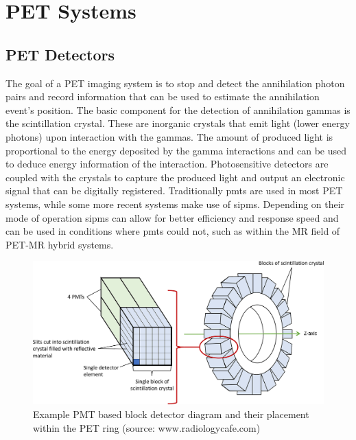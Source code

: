 \section{PET Systems}

\subsection{PET Detectors}
The goal of a PET imaging system is to stop and detect the annihilation photon pairs and record information that can be used to estimate the annihilation event's position.
The basic component for the detection of annihilation gammas is the scintillation crystal. These are inorganic crystals that emit light (lower energy photons) upon interaction with the gammas. The amount of produced light is proportional to the energy deposited by the gamma interactions and can be used to deduce energy information of the interaction. Photosensitive detectors are coupled with the crystals to capture the produced light and output an electronic signal that can be digitally registered. Traditionally \glspl{pmt} are used in most PET systems, while some more recent systems make use of \glspl{sipm}. Depending on their mode of operation \glspl{sipm} can allow for better efficiency and response speed and can be used in conditions where \glspl{pmt} could not, such as within the MR field of PET-MR hybrid systems.
%
\begin{figure} [h!]
\centering
\includegraphics[scale=0.25,angle=0]{2_Theory_Methods/figures/block_detector.png}
\caption{Example PMT based block detector diagram and their placement within the PET ring (source: www.radiologycafe.com) } 
\label{fig_2:BlockDetectorAndRing}
\end{figure} 
